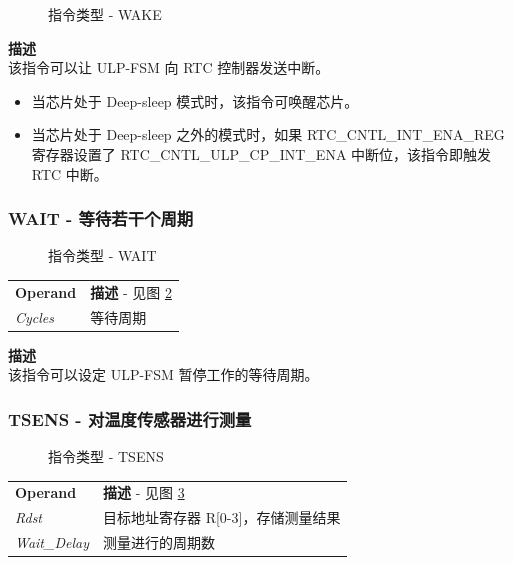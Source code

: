 \documentclass[main\_\_CN.tex]{subfiles}
\begin{document}
%
%
%
%
\begin{figure}[!ht]
    \centering
    \caption{指令类型 - WAKE}
    \label{figure:WAKE}
\end{figure}

\textbf{描述} \\
该指令可以让 ULP-FSM 向 RTC 控制器发送中断。
\begin{itemize}
    \item 当芯片处于 Deep-sleep 模式时，该指令可唤醒芯片。
    \item 当芯片处于 Deep-sleep 之外的模式时，如果 RTC\_CNTL\_INT\_ENA\_REG 寄存器设置了 RTC\_CNTL\_ULP\_CP\_INT\_ENA 中断位，该指令即触发 RTC 中断。
\end{itemize}



\subsubsection {WAIT - 等待若干个周期}

%
%
%
\begin{figure}[!ht]
    \centering
    \caption{指令类型 - WAIT}
    \label{figure:WAIT}
\end{figure}

\begin{tabular}{ l l }
\textbf{Operand} & \textbf{描述} - 见图 \ref{figure:WAIT} \\
\textit{Cycles} & 等待周期
\end{tabular}

\textbf{描述} \\
该指令可以设定 ULP-FSM 暂停工作的等待周期。


\subsubsection {TSENS - 对温度传感器进行测量}

%
%
%
%
\begin{figure}[!ht]
    \centering
    \caption{指令类型 - TSENS}
    \label{figure:TSENS}
\end{figure}

\begin{tabular}{ l l }
\textbf{Operand} & \textbf{描述} - 见图 \ref{figure:TSENS} \\
\textit{Rdst} & 目标地址寄存器 R[0-3]，存储测量结果 \\
\textit{Wait\_Delay} & 测量进行的周期数
\end{tabular}
\end{document}
